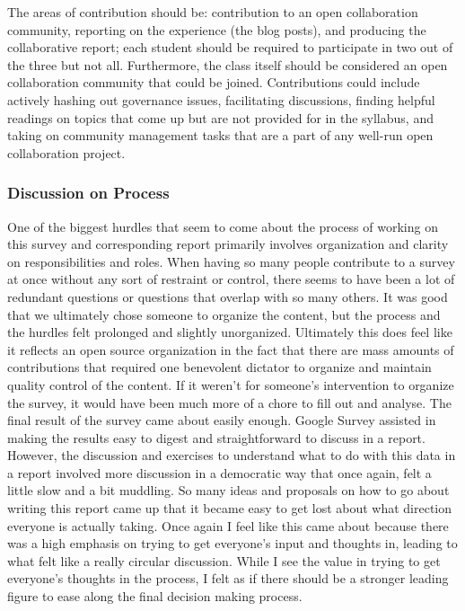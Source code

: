 The areas of contribution should be: contribution to an open collaboration community, reporting on the experience (the blog posts), and producing the collaborative report; each student should be required to participate in two out of the three but not all. Furthermore, the class itself should be considered an open collaboration community that could be joined. Contributions could include actively hashing out governance issues, facilitating discussions, finding helpful readings on topics that come up but are not provided for in the syllabus, and taking on community management tasks that are a part of any well-run open collaboration project. 

\subsubsection{Discussion on Process}
One of the biggest hurdles that seem to come about the process of working on this survey and corresponding report primarily involves organization and clarity on responsibilities and roles. When having so many people contribute to a survey at once without any sort of restraint or control, there seems to have been a lot of redundant questions or questions that overlap with so many others. It was good that we ultimately chose someone to organize the content, but the process and the hurdles felt prolonged and slightly unorganized. Ultimately this does feel like it reflects an open source organization in the fact that there are mass amounts of contributions that required one benevolent dictator to organize and maintain quality control of the content. If it weren't for someone's intervention to organize the survey, it would have been much more of a chore to fill out and analyse. 
The final result of the survey came about easily enough. Google Survey assisted in making the results easy to digest and straightforward to discuss in a report. However, the discussion and exercises to understand what to do with this data in a report involved more discussion in a democratic way that once again, felt a little slow and a bit muddling. So many ideas and proposals on how to go about writing this report came up that it became easy to get lost about what direction everyone is actually taking. Once again I feel like this came about because there was a high emphasis on trying to get everyone’s input and thoughts in, leading to what felt like a really circular discussion. While I see the value in trying to get everyone's thoughts in the process, I felt as if there should be a stronger leading figure to ease along the final decision making process. 
